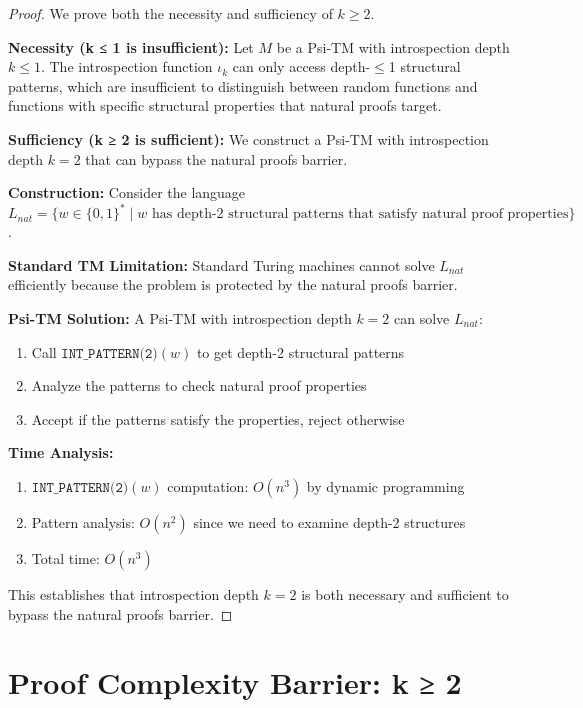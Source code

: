 \documentclass[11pt]{article}
\begin{document}
\begin{proof}
We prove both the necessity and sufficiency of $k \geq 2$.

\textbf{Necessity (k ≤ 1 is insufficient):}
Let $M$ be a Psi-TM with introspection depth $k \leq 1$. The introspection function $\iota_k$ can only access depth-$\leq$1 structural patterns, which are insufficient to distinguish between random functions and functions with specific structural properties that natural proofs target.

\textbf{Sufficiency (k ≥ 2 is sufficient):}
We construct a Psi-TM with introspection depth $k = 2$ that can bypass the natural proofs barrier.

\textbf{Construction:}
Consider the language $L_{nat} = \{w \in \{0,1\}^* \mid w \text{ has depth-2 structural patterns that satisfy natural proof properties}\}$.

\textbf{Standard TM Limitation:}
Standard Turing machines cannot solve $L_{nat}$ efficiently because the problem is protected by the natural proofs barrier.

\textbf{Psi-TM Solution:}
A Psi-TM with introspection depth $k = 2$ can solve $L_{nat}$:
\begin{enumerate}
\item Call $\texttt{INT\_PATTERN(2)}(w)$ to get depth-2 structural patterns
\item Analyze the patterns to check natural proof properties
\item Accept if the patterns satisfy the properties, reject otherwise
\end{enumerate}

\textbf{Time Analysis:}
\begin{enumerate}
\item $\texttt{INT\_PATTERN(2)}(w)$ computation: $O(n^3)$ by dynamic programming
\item Pattern analysis: $O(n^2)$ since we need to examine depth-2 structures
\item Total time: $O(n^3)$
\end{enumerate}

This establishes that introspection depth $k = 2$ is both necessary and sufficient to bypass the natural proofs barrier.
\end{proof}

\section{Proof Complexity Barrier: k ≥ 2}
\end{document}
